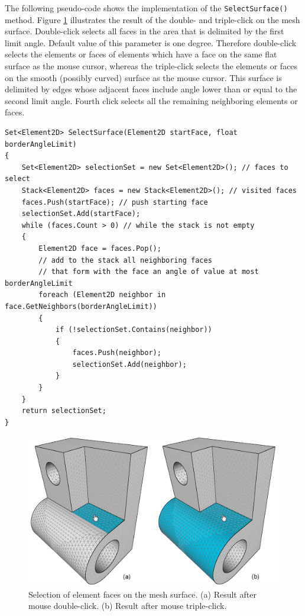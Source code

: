 The following pseudo-code shows the implementation of the \texttt{SelectSurface()} method. Figure \ref{fig:element-face-selection} illustrates the result of the double- and triple-click on the mesh surface. Double-click selects all faces in the area that is delimited by the first limit angle. Default value of this parameter is one degree. Therefore double-click selects the elements or faces of elements which have a face on the same flat surface as the mouse cursor, whereas the triple-click selects the elements or faces on the smooth (possibly curved) surface as the mouse cursor. This surface is delimited by edges whose adjacent faces include angle lower than or equal to the second limit angle. Fourth click selects all the remaining neighboring elements or faces.

{\small
\begin{Verbatim}[obeytabs,tabsize=4]
Set<Element2D> SelectSurface(Element2D startFace, float borderAngleLimit)
{
	Set<Element2D> selectionSet = new Set<Element2D>(); // faces to select
	Stack<Element2D> faces = new Stack<Element2D>(); // visited faces
	faces.Push(startFace); // push starting face
	selectionSet.Add(startFace);
	while (faces.Count > 0) // while the stack is not empty
	{
		Element2D face = faces.Pop();
		// add to the stack all neighboring faces
		// that form with the face an angle of value at most borderAngleLimit
		foreach (Element2D neighbor in face.GetNeighbors(borderAngleLimit))
		{
			if (!selectionSet.Contains(neighbor))
			{
				faces.Push(neighbor);
				selectionSet.Add(neighbor);
			}
		}
	}
	return selectionSet;
}
\end{Verbatim}
}

\begin{figure}[H]
\centering
\includegraphics[width=\textwidth]{figures/appendix-mesh-visualization/figure7}
\decoRule
\caption[Selection of element faces]{Selection of element faces on the mesh surface. (a) Result after mouse double-click. (b) Result after mouse triple-click.}
\label{fig:element-face-selection}
\end{figure}


